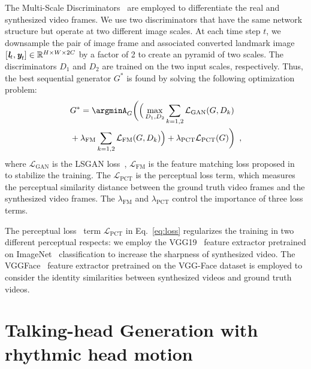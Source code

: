 \documentclass[runningheads]{llncs}
\def\mathbi#1{\textbf{\em #1}}
\providecommand{\CXu}[1]{\textcolor{red}{[{\bf #1}]}}
\begin{document}
The Multi-Scale Discriminators~\cite{wang2018high} are employed to differentiate the real and synthesized video frames. We use two discriminators that have the same network structure but operate at two different image scales. At each time step $t$, we downsample the pair of image frame and associated converted landmark image $[\mathbi{l}_{t}, \mathbi{y}_{t}] \in \mathbb{R}^{H\times W \times 2C} $ by a factor of 2 to create an pyramid of two scales. The discriminators $D_1$ and $D_2$ are trained on the two input scales, respectively. Thus, the best sequential generator $G^*$ is found by solving the following optimization problem:
\begin{equation}
\begin{aligned}
& G^* = \argminA_G\bigg{(} \Big{(} \max_{D_1,D_2}\sum_{k=1,2} \mathcal{L}_{\text{GAN}}(G,D_k) \\
& + \lambda_{\text{FM}} \sum_{k=1,2} \mathcal{L}_{\text{FM}}(G,D_k) \Big{)} + \lambda_{\text{PCT}} \mathcal{L}_{\text{PCT}}(G)\bigg{)}  \enspace,
\end{aligned}
\label{eq:loss}    
\end{equation}
where $\mathcal{L}_{\text{GAN}}$ is the LSGAN loss~\cite{mao2017least}, $\mathcal{L}_{\text{FM}}$ is the feature matching loss proposed in 
~\cite{wang2018high} to stabilize the training. The $\mathcal{L}_{\text{PCT}}$ is the perceptual loss term, which measures the perceptual similarity distance between the ground truth video frames and the synthesized video frames. The $\lambda_{\text{FM}}$ and $\lambda_{\text{PCT}}$ control the importance of three loss terms. 

The perceptual loss~\cite{johnson2016perceptual} term $\mathcal{L}_{\text{PCT}}$ in Eq.~\ref{eq:loss} regularizes the training in two different perceptual respects: we employ the VGG19~\cite{Simonyan15} feature extractor pretrained on ImageNet~\cite{deng2009imagenet} classification to increase the sharpness of synthesized video. The VGGFace~\cite{parkhi2015deep} feature extractor pretrained on the VGG-Face dataset is employed to consider the identity similarities between synthesized videos and ground truth videos.  


\section{Talking-head Generation with rhythmic head motion }
\label{sec:infer}

\end{document}

